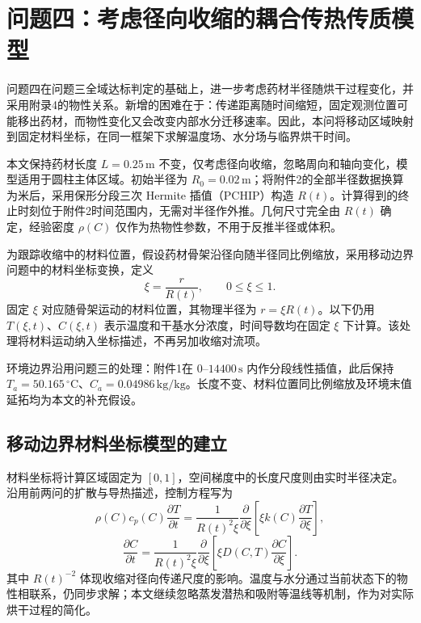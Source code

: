 \section{问题四：考虑径向收缩的耦合传热传质模型}

问题四在问题三全域达标判定的基础上，进一步考虑药材半径随烘干过程变化，并采用附录4的物性关系。新增的困难在于：传递距离随时间缩短，固定观测位置可能移出药材，而物性变化又会改变内部水分迁移速率。因此，本问将移动区域映射到固定材料坐标，在同一框架下求解温度场、水分场与临界烘干时间。

本文保持药材长度 $L=0.25\,\mathrm{m}$ 不变，仅考虑径向收缩，忽略周向和轴向变化，模型适用于圆柱主体区域。初始半径为 $R_0=0.02\,\mathrm{m}$；将附件2的全部半径数据换算为米后，采用保形分段三次 Hermite 插值（PCHIP）构造 $R(t)$\cite{fritsch1980}。计算得到的终止时刻位于附件2时间范围内，无需对半径作外推。几何尺寸完全由 $R(t)$ 确定，经验密度 $\rho(C)$ 仅作为热物性参数，不用于反推半径或体积。

为跟踪收缩中的材料位置，假设药材骨架沿径向随半径同比例缩放，采用移动边界问题中的材料坐标变换\cite{crank1984}，定义
\begin{equation}
\xi=\frac{r}{R(t)},\qquad 0\leq\xi\leq1.
\label{eq:q4-coordinate}
\end{equation}
固定 $\xi$ 对应随骨架运动的材料位置，其物理半径为 $r=\xi R(t)$。以下仍用 $T(\xi,t)$、$C(\xi,t)$ 表示温度和干基水分浓度，时间导数均在固定 $\xi$ 下计算。该处理将材料运动纳入坐标描述，不再另加收缩对流项。

环境边界沿用问题三的处理：附件1在 $0$--$14400\,\mathrm{s}$ 内作分段线性插值，此后保持 $T_a=50.165\,{}^\circ\mathrm{C}$、$C_a=0.04986\,\mathrm{kg/kg}$。长度不变、材料位置同比例缩放及环境末值延拓均为本文的补充假设。

\subsection{移动边界材料坐标模型的建立}

材料坐标将计算区域固定为 $[0,1]$，空间梯度中的长度尺度则由实时半径决定。沿用前两问的扩散与导热描述，控制方程写为
\begin{equation}
\rho(C)c_p(C)\frac{\partial T}{\partial t}
=\frac{1}{R(t)^2\xi}\frac{\partial}{\partial\xi}
\left[\xi k(C)\frac{\partial T}{\partial\xi}\right],
\label{eq:q4-temperature}
\end{equation}
\begin{equation}
\frac{\partial C}{\partial t}
=\frac{1}{R(t)^2\xi}\frac{\partial}{\partial\xi}
\left[\xi D(C,T)\frac{\partial C}{\partial\xi}\right].
\label{eq:q4-moisture}
\end{equation}
其中 $R(t)^{-2}$ 体现收缩对径向传递尺度的影响。温度与水分通过当前状态下的物性相联系，仍同步求解；本文继续忽略蒸发潜热和吸附等温线等机制，作为对实际烘干过程的简化。

